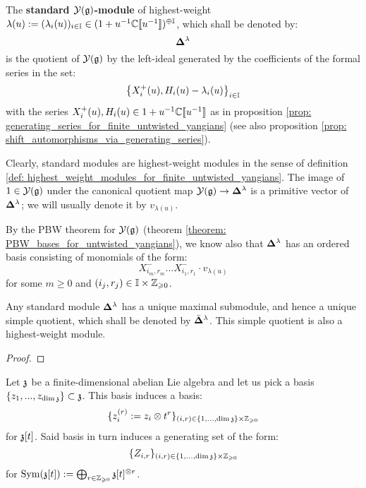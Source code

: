         \begin{definition} \label{def: standard_modules_for_finite_untwisted_yangians}
            The \textbf{standard $\mathcal{Y}(\mathfrak{g})$-module} of highest-weight $\lambda(u) := ( \lambda_i(u) )_{i \in \mathbb{I}} \in (1 + u^{-1} \mathbb{C}[\![u^{-1}]\!])^{\oplus \mathbb{I}}$, which shall be denoted by:
                $$\mathbf{ \Delta }^{\lambda}$$
            is the quotient of $\mathcal{Y}(\mathfrak{g})$ by the left-ideal generated by the coefficients of the formal series in the set:
                $$\left\{ X_i^+(u), H_i(u) - \lambda_i(u) \right\}_{i \in \mathbb{I}}$$
            with the series $X_i^+(u), H_i(u) \in 1 + u^{-1} \mathbb{C}[\![u^{-1}]\!]$ as in proposition \ref{prop: generating_series_for_finite_untwisted_yangians} (see also proposition \ref{prop: shift_automorphisms_via_generating_series}).
        \end{definition}
        Clearly, standard modules are highest-weight modules in the sense of definition \ref{def: highest_weight_modules_for_finite_untwisted_yangians}. The image of $1 \in \mathcal{Y}(\mathfrak{g})$ under the canonical quotient map $\mathcal{Y}(\mathfrak{g}) \to \mathbf{ \Delta }^{\lambda}$ is a primitive vector of $\mathbf{ \Delta }^{\lambda}$; we will usually denote it by $v_{\lambda(u)}$.

        By the PBW theorem for $\mathcal{Y}(\mathfrak{g})$ (theorem \ref{theorem: PBW_bases_for_untwisted_yangians}), we know also that $\mathbf{ \Delta }^{\lambda}$ has an ordered basis consisting of monomials of the form:
            $$X^-_{i_m, r_m} ... X^-_{i_1, r_1} \cdot v_{\lambda(u)}$$
        for some $m \geq 0$ and $(i_j, r_j) \in \simpleroots \x \Z_{\geq 0}$.

        \begin{lemma} \label{lemma: unqiue_simple_quotients_of_finite_untwisted_yangian_standard_modules}
            Any standard module $\mathbf{ \Delta }^{\lambda}$ has a unique maximal submodule, and hence a unique simple quotient, which shall be denoted by $\bar{ \mathbf{ \Delta } }^{\lambda}$. This simple quotient is also a highest-weight module.
        \end{lemma}
            \begin{proof}
                
            \end{proof}

        Let $\mathfrak{z}$ be a finite-dimensional abelian Lie algebra and let us pick a basis $\{z_1, ..., z_{\dim \mathfrak{z}}\} \subset \mathfrak{z}$. This basis induces a basis:
            $$\{ z_i^{(r)} := z_i \tensor t^r \}_{(i, r) \in \{1, ..., \dim \z\} \x \Z_{\geq 0}}$$
        for $\mathfrak{z}[t]$. Said basis in turn induces a generating set of the form:
            $$\{ Z_{i, r} \}_{(i, r) \in \{1, ..., \dim \z\} \x \Z_{\geq 0}}$$
        for $\Sym(\z[t]) := \bigoplus_{r \in \Z_{\geq 0}} \z[t]^{\tensor r}$.
        
